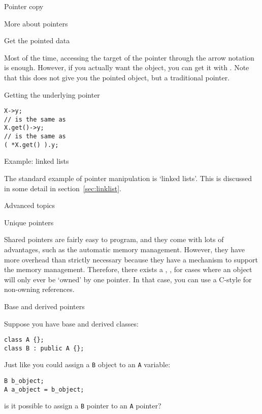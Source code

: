 \begin{block}{Pointer copy}
  \label{sl:shared-ptr-copy}
\end{block}

 {More about pointers}

 {Get the pointed data}

Most of the time, accessing the target of the pointer through the
arrow notation is enough. However, if you actually want the object,
you can get it with . Note that this does not give
you the pointed object, but a traditional pointer.

\begin{block}{Getting the underlying pointer}
  \label{sl:pointer-get}
\begin{lstlisting}
X->y;
// is the same as
X.get()->y;
// is the same as
( *X.get() ).y;
\end{lstlisting}

\end{block}

 {Example: linked lists}

The standard example of pointer manipulation is `linked lists'. This
is discussed in some detail in section~\ref{sec:linklist}.

 {Advanced topics}

 {Unique pointers}

Shared pointers are fairly easy to program, and they come with lots of
advantages, such as the automatic memory management. However, they
have more overhead than strictly necessary because they have a
 mechanism to support the memory
management. Therefore, there exists a ,
, for cases where an object will only ever be
`owned' by one pointer. In that case, you can use a C-style
 for non-owning references.

 {Base and derived pointers}

Suppose you have base and derived classes:
\begin{lstlisting}
class A {};
class B : public A {};  
\end{lstlisting}
Just like you could assign a \lstinline{B} object to an \lstinline{A}
variable:
\begin{lstlisting}
B b_object;
A a_object = b_object;
\end{lstlisting}
is it possible to assign a \lstinline{B} pointer to an \lstinline{A}
pointer?

